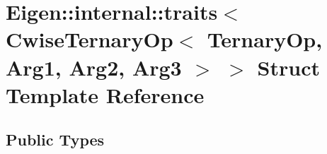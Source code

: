 \hypertarget{struct_eigen_1_1internal_1_1traits_3_01_cwise_ternary_op_3_01_ternary_op_00_01_arg1_00_01_arg2_00_01_arg3_01_4_01_4}{}\section{Eigen\+:\+:internal\+:\+:traits$<$ Cwise\+Ternary\+Op$<$ Ternary\+Op, Arg1, Arg2, Arg3 $>$ $>$ Struct Template Reference}
\label{struct_eigen_1_1internal_1_1traits_3_01_cwise_ternary_op_3_01_ternary_op_00_01_arg1_00_01_arg2_00_01_arg3_01_4_01_4}
\subsection*{Public Types}
